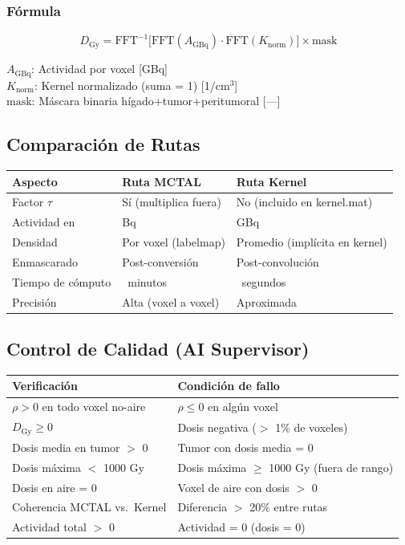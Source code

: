 \documentclass[12pt,a4paper]{article}
\newcommand{\vardef}[2]{\noindent\textbf{#1}: #2\\}
\begin{document}
\subsubsection{Fórmula}

$$D_{\text{Gy}} = \text{FFT}^{-1}\big[\text{FFT}(A_{\text{GBq}}) \cdot \text{FFT}(K_{\text{norm}})\big] \times \text{mask}$$

\vardef{$A_{\text{GBq}}$}{Actividad por voxel [GBq]}
\vardef{$K_{\text{norm}}$}{Kernel normalizado (suma = 1) [1/cm$^3$]}
\vardef{$\text{mask}$}{Máscara binaria hígado+tumor+peritumoral [---]}

\subsection{Comparación de Rutas}

\begin{tabular}{p{4cm} p{5cm} p{5cm}}
\toprule
\textbf{Aspecto} & \textbf{Ruta MCTAL} & \textbf{Ruta Kernel} \\
\midrule
Factor $\tau$ & Sí (multiplica fuera) & No (incluido en kernel.mat) \\
Actividad en & Bq & GBq \\
Densidad & Por voxel (labelmap) & Promedio (implícita en kernel) \\
Enmascarado & Post-conversión & Post-convolución \\
Tiempo de cómputo & ~minutos & ~segundos \\
Precisión & Alta (voxel a voxel) & Aproximada \\
\bottomrule
\end{tabular}

\subsection*{Control de Calidad (AI Supervisor)}

\begin{tabular}{p{5cm} p{10cm}}
\toprule
\textbf{Verificación} & \textbf{Condición de fallo} \\
\midrule
$\rho > 0$ en todo voxel no-aire & $\rho \leq 0$ en algún voxel \\
$D_{\text{Gy}} \geq 0$ & Dosis negativa ($>$ 1\% de voxeles) \\
Dosis media en tumor $>$ 0 & Tumor con dosis media = 0 \\
Dosis máxima $<$ 1000 Gy & Dosis máxima $\geq$ 1000 Gy (fuera de rango) \\
Dosis en aire = 0 & Voxel de aire con dosis $>$ 0 \\
Coherencia MCTAL vs.\ Kernel & Diferencia $>$ 20\% entre rutas \\
Actividad total $>$ 0 & Actividad = 0 (dosis = 0) \\
\bottomrule
\end{tabular}
\end{document}
